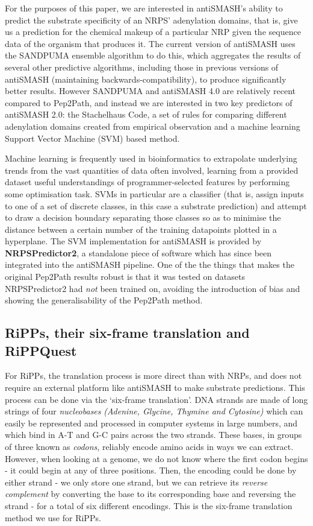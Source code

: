 \documentclass{l4proj}
\newcommand{\cit}[1]{\citep{#1}}
\begin{document}
For the purposes of this paper, we are interested in antiSMASH's ability to predict the substrate specificity of an NRPS' adenylation domains, that is, give us a prediction for the chemical makeup of a particular NRP given the sequence data of the organism that produces it. The current version of antiSMASH uses the SANDPUMA ensemble algorithm to do this, which aggregates the results of several other predictive algorithms, including those in previous versions of antiSMASH (maintaining backwards-compatibility), to produce significantly better results. However SANDPUMA and antiSMASH 4.0 are relatively recent compared to Pep2Path, and instead we are interested in two key predictors of antiSMASH 2.0: the Stachelhaus Code, a set of rules for comparing different adenylation domains created from empirical observation \cit{stachelhaus} and a machine learning Support Vector Machine (SVM) based method.

Machine learning is frequently used in bioinformatics to extrapolate underlying trends from the vast quantities of data often involved, learning from a provided dataset useful understandings of programmer-selected features by performing some optimisation task. SVMs in particular are a classifier (that is, assign inputs to one of a set of discrete classes, in this case a substrate prediction) and attempt to draw a decision boundary separating those classes so as to minimise the distance between a certain number of the training datapoints plotted in a hyperplane. The SVM implementation for antiSMASH is provided by \textbf{NRPSPredictor2}, \cit{nrps2} a standalone piece of software which has since been integrated into the antiSMASH pipeline. One of the the things that makes the original Pep2Path results robust is that it was tested on datasets NRPSPredictor2 had \textit{not} been trained on, avoiding the introduction of bias and showing the generalisability of the Pep2Path method.

\subsection{RiPPs, their six-frame translation and RiPPQuest} \label{ripps}

For RiPPs, the translation process is more direct than with NRPs, and does not require an external platform like antiSMASH to make substrate predictions. This process can be done via the `six-frame translation'. DNA strands are made of long strings of four \textit{nucleobases} \textit{(Adenine, Glycine, Thymine and Cytosine)} which can easily be represented and processed in computer systems in large numbers, and which bind in A-T and G-C pairs across the two strands. These bases, in groups of three known as \textit{codons}, reliably encode amino acids in ways we can extract. However, when looking at a genome, we do not know where the first codon begins - it could begin at any of three positions. Then, the encoding could be done by either strand - we only store one strand, but we can retrieve its \textit{reverse complement} by converting the base to its corresponding base and reversing the strand - for a total of six different encodings. This is the six-frame translation method we use for RiPPs.
\end{document}
